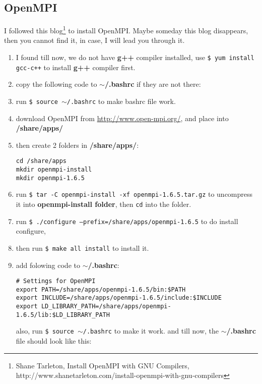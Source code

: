 \subsection{OpenMPI}
I followed this blog\footnote{Shane Tarleton, Install OpenMPI with GNU Compilers, 
http://www.shanetarleton.com/install-openmpi-with-gnu-compilers} to install OpenMPI. Maybe someday this blog disappears, then you cannot find it, in case, I will lead you through it. 
\begin{enumerate}
\item I found till now, we do not have {\bf g++} compiler installed, use {\tt \$ yum install gcc-c++} to install {\bf g++} compiler first.
\item copy the following code to {\bf $\sim$/.bashrc} if they are not there:

\item run {\tt \$ source $\sim$/.bashrc} to make bashrc file work.
\item download OpenMPI from \url{http://www.open-mpi.org/}, and place into {\bf /share/apps/}
\item then create 2 folders in {\bf /share/apps/}:
\begin{lstlisting}[basicstyle=\ttfamily\scriptsize,columns=fullflexible]
cd /share/apps
mkdir openmpi-install
mkdir openmpi-1.6.5
\end{lstlisting}
\item run {\tt \$ tar -C openmpi-install -xf openmpi-1.6.5.tar.gz} to uncompress it into {\bf openmpi-install folder}, then {\tt cd} into the folder.
\item run {\tt \$ ./configure --prefix=/share/apps/openmpi-1.6.5} to do install configure, 
\item then run {\tt \$ make all install} to install it.
\item add folowing code to {\bf $\sim$/.bashrc}:
\begin{lstlisting}[basicstyle=\ttfamily\scriptsize,columns=fullflexible]
# Settings for OpenMPI
export PATH=/share/apps/openmpi-1.6.5/bin:$PATH
export INCLUDE=/share/apps/openmpi-1.6.5/include:$INCLUDE
export LD_LIBRARY_PATH=/share/apps/openmpi-1.6.5/lib:$LD_LIBRARY_PATH
\end{lstlisting}
also, run {\tt \$ source $\sim$/.bashrc} to make it work.
and till now, the {\bf $\sim$/.bashrc} file should look like this:

\end{enumerate}
